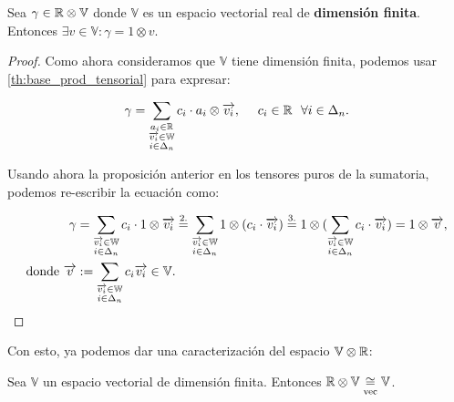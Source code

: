 \begin{proposicion} \label{prop:r_otimes_v_es_v}
    Sea $\gamma \in \mathbb{R} \otimes \mathbb{V}$ donde $\mathbb{V}$ es un espacio vectorial real de \textbf{dimensión finita}. Entonces $\exists v \in \mathbb{V}: \gamma = 1 \otimes v$.
\end{proposicion}
\begin{proof}
    Como ahora consideramos que $\mathbb{V}$ tiene dimensión finita, podemos usar \ref{th:base_prod_tensorial} para expresar:

    \begin{equation}
        \gamma = \sum_{\substack{a_i \in \mathbb{R}\\ \overrightarrow{v_i} \in \mathbb{W}\\ i \in \Delta_{n}}} c_{i} \cdot a_i \otimes \overrightarrow{v_i}, \ \ \ \  c_{i} \in \mathbb{R} \ \  \forall i \in \Delta_{n}.
    \end{equation}

    Usando ahora la proposición anterior en los tensores puros de la sumatoria, podemos re-escribir la ecuación como:

    \begin{equation}
        \begin{split}
            \gamma &= \sum_{\substack{\overrightarrow{v_i} \in \mathbb{W}\\ i \in \Delta_{n}}} c_{i} \cdot 1 \otimes \overrightarrow{v_i} \stackrel{\text{2.}}{=} \sum_{\substack{\overrightarrow{v_i} \in \mathbb{W}\\ i \in \Delta_{n}}} 1 \otimes (c_{i} \cdot \overrightarrow{v_i}) \stackrel{\text{3.}}{=} 1 \otimes ( \sum_{\substack{\overrightarrow{v_i} \in \mathbb{W} \\ i \in \Delta_{n}}} c_{i} \cdot \overrightarrow{v_i} ) = 1 \otimes \overrightarrow{v}, \\
            \text{donde } \overrightarrow{v} &:= \sum_{\substack{\overrightarrow{v_i} \in \mathbb{W}\\ i \in \Delta_{n}}} c_{i} \overrightarrow{v_i} \in \mathbb{V}. \\
        \end{split}
    \end{equation}

\end{proof}

Con esto, ya podemos dar una caracterización del espacio $\mathbb{V} \otimes \mathbb{R}$:

\begin{proposicion}
    Sea $\mathbb{V}$ un espacio vectorial de dimensión finita. Entonces $\mathbb{R} \otimes \mathbb{V} \underset{\text{vec}}{\cong} \mathbb{V}$.
\end{proposicion}

